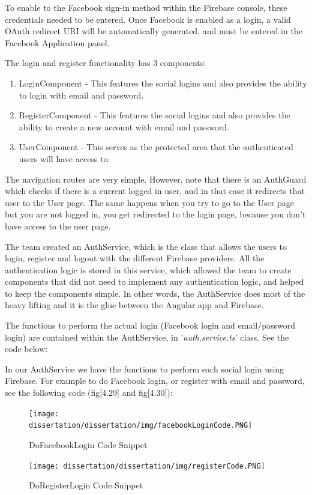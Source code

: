 To enable to the Facebook sign-in method within the Firebase console, these credentials needed to be entered. Once Facebook is enabled as a login, a valid OAuth redirect URI will be automatically generated, and must be entered in the Facebook Application panel.

\bigskip

The login and register functionality has 3 components:

\begin{enumerate}
    \item LoginComponent - This features the social logins and also provides the ability to login with email and password.
    \item RegisterComponent - This features the social logins and also provides the ability to create a new account with email and password.
    \item UserComponent - This serves as the protected area that the authenticated users will have access to.
\end{enumerate}

The navigation routes are very simple. However, note that there is an AuthGuard which checks if there is a current logged in user, and in that case it redirects that user to the User page. The same happens when you try to go to the User page but you are not logged in, you get redirected to the login page, because you don’t have access to the user page.

The team created an AuthService, which is the class that allows the users to login, register and logout with the different Firebase providers. All the authentication logic is stored in this service, which allowed the team to create components that did not need to implement any authentication logic, and helped to keep the components simple. In other words, the AuthService does most of the heavy lifting and it is the glue between the Angular app and Firebase.

\bigskip

The functions to perform the actual login (Facebook login and email/password login) are contained within the AuthService, in '\textit{auth.service.ts}' class. See the code below:


In our AuthService we have the functions to perform each social login using Firebase. For example to do Facebook login, or register with email and password, see the following code (fig[4.29] and fig[4.30]): 




\begin{figure}[H]
  \centering
  \begin{minipage}[b]{0.48\textwidth}
    \texttt{[image: dissertation/dissertation/img/facebookLoginCode.PNG]}
    \caption{DoFacebookLogin Code Snippet}
  \end{minipage}
  \hfill
  \begin{minipage}[b]{0.48\textwidth}
    \texttt{[image: dissertation/dissertation/img/registerCode.PNG]}
    \caption{DoRegisterLogin Code Snippet}
  \end{minipage}
\end{figure}

